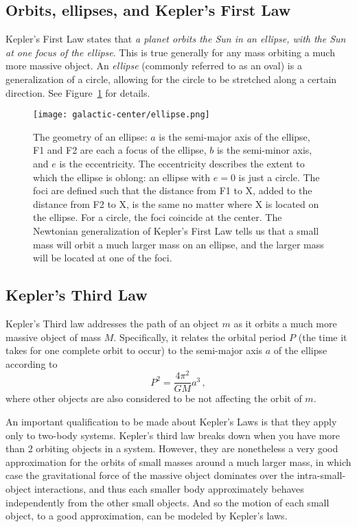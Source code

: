 \subsection{Orbits, ellipses, and Kepler's First Law}
Kepler's First Law states that \textit{a planet orbits the Sun in an ellipse, with the Sun at one focus of the ellipse}. This is true generally for any mass orbiting a much more massive object. An \textit{ellipse} (commonly referred to as an oval) is a generalization of a circle, allowing for the circle to be stretched along a certain direction. See Figure~\ref{gc:fig:ellipse} for details.

\begin{figure}
	\centering
	\texttt{[image: galactic-center/ellipse.png]}
	\caption{The geometry of an ellipse: $a$ is the semi-major axis of the ellipse, F1 and F2 are each a
		focus of the ellipse, $b$ is the semi-minor axis, and $e$ is the eccentricity. The eccentricity describes
		the extent to which the ellipse is oblong: an ellipse with $e = 0$ is just a circle. The foci are defined such
		that the distance from F1 to X, added to the distance from F2 to X, is the same no matter where X
		is located on the ellipse. For a circle, the foci coincide at the center. The Newtonian generalization of
		Kepler's First Law tells us that a small mass will orbit a much larger mass on an ellipse, and the larger
		mass will be located at one of the foci.}\label{gc:fig:ellipse}
\end{figure}

\subsection{Kepler's Third Law}

Kepler’s Third law addresses the path of an object $m$ as it orbits a much more massive object of mass $M$. Specifically, it relates the orbital period $P$ (the time it takes for one complete orbit to occur) to the semi-major axis $a$ of the ellipse according to
\begin{equation}\label{gc:eq:kepler-3}
P^2 = \frac{4 \pi^2}{G M} a^3 \,,
\end{equation}
where other objects are also considered to be not affecting the orbit of $m$. %

An important qualification to be made about Kepler’s Laws is that they apply only to two-body
systems. Kepler’s third law breaks down when you have more than 2 orbiting objects in a system.
However, they are nonetheless a very good approximation for the orbits of small masses around a much
larger mass, in which case the gravitational force of the massive object dominates over the intra-small-
object interactions, and thus each smaller body approximately behaves independently from the other
small objects. And so the motion of each small object, to a good approximation, can be modeled by
Kepler’s laws.


